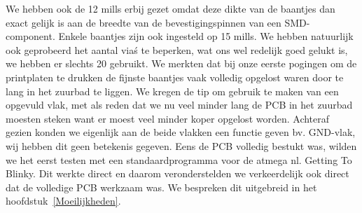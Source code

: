 We hebben ook de 12 mills erbij gezet omdat deze dikte van de baantjes dan exact gelijk is aan de breedte van de bevestigingspinnen van een SMD-component. Enkele baantjes zijn ook ingesteld op 15 mills. We hebben natuurlijk ook geprobeerd het aantal via\'s te beperken, wat ons wel redelijk goed gelukt is, we hebben er slechts 20 gebruikt. We merkten dat bij onze eerste pogingen om de printplaten te drukken de fijnste baantjes vaak volledig opgelost waren door te lang in het zuurbad te liggen. We kregen de tip om gebruik te maken van een opgevuld vlak, met als reden dat we nu veel minder lang de PCB in het zuurbad moesten steken want er moest veel minder koper opgelost worden. Achteraf gezien konden we eigenlijk aan de beide vlakken een functie geven bv. GND-vlak, wij hebben dit geen betekenis gegeven. Eens de PCB volledig bestukt was, wilden we het eerst testen met een standaardprogramma voor de atmega nl. Getting To Blinky. Dit werkte direct en daarom veronderstelden we verkeerdelijk ook direct dat de volledige PCB werkzaam was. We bespreken dit uitgebreid in het hoofdstuk~\ref{Moeilijkheden}. 

